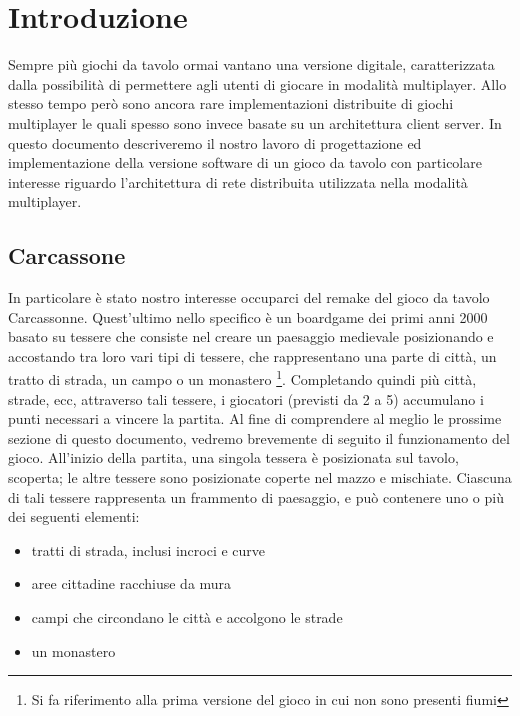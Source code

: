 \section{Introduzione}
Sempre più giochi da tavolo ormai vantano una versione digitale,
caratterizzata dalla possibilità di permettere agli utenti di giocare in
modalità multiplayer.
Allo stesso tempo però sono ancora rare implementazioni distribuite di
giochi multiplayer le quali spesso sono invece basate su un architettura
client server. In questo documento descriveremo il nostro lavoro di
progettazione ed implementazione della versione software di un gioco da
tavolo con particolare interesse riguardo l'architettura di rete
distribuita utilizzata nella modalità multiplayer.

\subsection{Carcassone}
In particolare è stato nostro interesse occuparci del remake del gioco
da tavolo Carcassonne. Quest'ultimo nello specifico è un boardgame dei
primi anni 2000 basato su tessere che consiste nel creare un paesaggio medievale 
posizionando e accostando tra loro vari tipi di tessere, che rappresentano una parte di città, 
un tratto di strada, un campo o un monastero \footnote{Si fa riferimento
alla prima versione del gioco in cui non sono presenti fiumi}.
Completando quindi più città, strade, ecc, attraverso tali tessere, i
giocatori (previsti da 2 a 5) accumulano i punti necessari a vincere la partita.
Al fine di comprendere al meglio le prossime sezione di questo documento, 
vedremo
brevemente di seguito il funzionamento del gioco.
All'inizio della partita, una singola tessera è posizionata sul tavolo, scoperta; 
le altre tessere sono posizionate coperte nel mazzo e mischiate.
Ciascuna di tali tessere rappresenta un frammento di paesaggio, e può contenere uno o più dei seguenti elementi:

\begin{itemize}
	\item tratti di strada, inclusi incroci e curve
    \item aree cittadine racchiuse da mura
    \item campi che circondano le città e accolgono le strade
    \item un monastero
\end{itemize}


